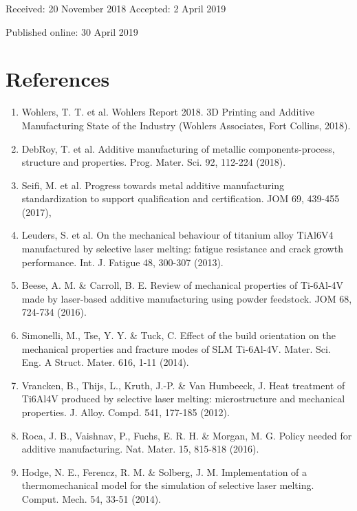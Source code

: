 \documentclass[10pt]{article}
\begin{document}
Received: 20 November 2018 Accepted: 2 April 2019

Published online: 30 April 2019

\section*{References}
\begin{enumerate}
  \item Wohlers, T. T. et al. Wohlers Report 2018. 3D Printing and Additive Manufacturing State of the Industry (Wohlers Associates, Fort Collins, 2018).

  \item DebRoy, T. et al. Additive manufacturing of metallic components-process, structure and properties. Prog. Mater. Sci. 92, 112-224 (2018).

  \item Seifi, M. et al. Progress towards metal additive manufacturing standardization to support qualification and certification. JOM 69, 439-455 (2017),

  \item Leuders, S. et al. On the mechanical behaviour of titanium alloy TiAl6V4 manufactured by selective laser melting: fatigue resistance and crack growth performance. Int. J. Fatigue 48, 300-307 (2013).

  \item Beese, A. M. \& Carroll, B. E. Review of mechanical properties of Ti-6Al-4V made by laser-based additive manufacturing using powder feedstock. JOM 68, 724-734 (2016).

  \item Simonelli, M., Tse, Y. Y. \& Tuck, C. Effect of the build orientation on the mechanical properties and fracture modes of SLM Ti-6Al-4V. Mater. Sci. Eng. A Struct. Mater. 616, 1-11 (2014).

  \item Vrancken, B., Thijs, L., Kruth, J.-P. \& Van Humbeeck, J. Heat treatment of Ti6Al4V produced by selective laser melting: microstructure and mechanical properties. J. Alloy. Compd. 541, 177-185 (2012).

  \item Roca, J. B., Vaishnav, P., Fuchs, E. R. H. \& Morgan, M. G. Policy needed for additive manufacturing. Nat. Mater. 15, 815-818 (2016).

  \item Hodge, N. E., Ferencz, R. M. \& Solberg, J. M. Implementation of a thermomechanical model for the simulation of selective laser melting. Comput. Mech. 54, 33-51 (2014).


\end{enumerate}
\end{document}
